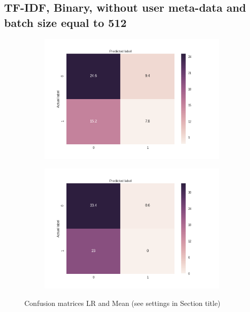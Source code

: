 \documentclass[sigconf]{acmart-txmm}
\begin{document}
\subsection{TF-IDF, Binary, without user meta-data and batch size equal to 512}

\begin{figure}[H]
\centering
\begin{subfigure}
  \centering
  \includegraphics[width=1\linewidth]{report/img/conf_matrices/keywords_tfidf_binary_0_0_512_LR.png}
  \label{fig:keywords_tfidf_binary_0_0_512_LR}
\end{subfigure}%
\begin{subfigure}
  \centering
  \includegraphics[width=1\linewidth]{report/img/conf_matrices/keywords_tfidf_binary_0_0_512_mean.png}
  \label{fig:keywords_tfidf_binary_0_0_512_mean}
\end{subfigure}
\caption{Confusion matrices LR and Mean (see settings in Section title)}
\label{fig:keywords_tfidf_binary_0_0_512}
\end{figure}
\end{document}
